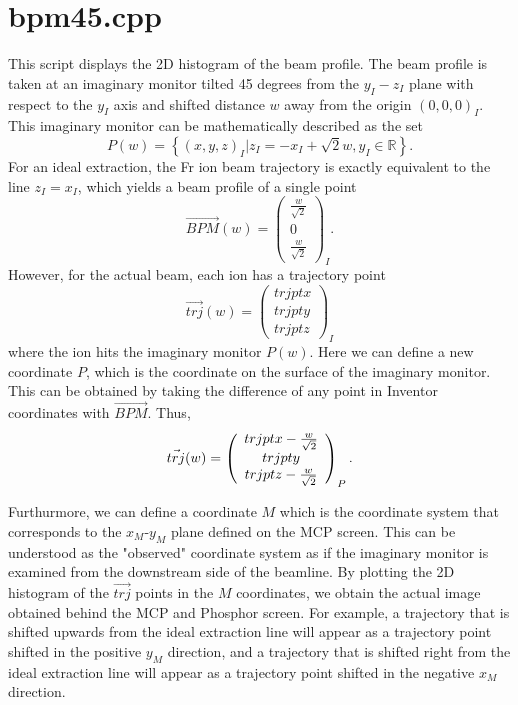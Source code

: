 \documentclass{article}
\begin{document}
\section{bpm45.cpp}
This script displays the 2D histogram of the beam profile. The beam profile is taken at an imaginary monitor tilted 45 degrees from the $y_I-z_I$ plane with respect to the $y_I$ axis and shifted distance $w$ away from the origin $(0,0,0)_I$. This imaginary monitor can be mathematically described as the set 
\begin{equation*}
P(w) = \left\{ (x,y,z)_I | z_I = -x_I + \sqrt{2}w, y_I \in \mathbb{R} \right\}.
\end{equation*}
For an ideal extraction, the Fr ion beam trajectory is exactly equivalent to the line $z_I = x_I$, which yields a beam profile of a single point
\begin{equation*}
\vec{BPM}(w) = \left(
\begin{array}{c}
	\frac{w}{\sqrt{2}}\\
	0 \\
	\frac{w}{\sqrt{2}}
\end{array} \right)_I.
\end{equation*}
However, for the actual beam, each ion has a trajectory point
\begin{equation*}
\vec{trj}(w) = \left(
\begin{array}{c}
	trjptx \\
	trjpty \\
	trjptz
\end{array} \right)_I
\end{equation*}
where the ion hits the imaginary monitor $P(w)$. Here we can define a new coordinate $P$, which is the coordinate on the surface of the imaginary monitor. This can be obtained by taking the difference of any point in Inventor coordinates with $\vec{BPM}$. Thus, 
\begin{equation*}
\vec{trj}(w) = \left(
\begin{array}{c}
	trjptx - \frac{w}{\sqrt{2}} \\
	trjpty \\
	trjptz - \frac{w}{\sqrt{2}}
\end{array} \right)_P . \\
\end{equation*}

Furthurmore, we can define a coordinate $M$ which is the coordinate system that corresponds to the $x_M$-$y_M$ plane defined on the MCP screen. This can be understood as the "observed" coordinate system as if the imaginary monitor is examined from the downstream side of the beamline. By plotting the 2D histogram of the $\vec{trj}$ points in the $M$ coordinates, we obtain the actual image obtained behind the MCP and Phosphor screen. For example, a trajectory that is shifted upwards from the ideal extraction line will appear as a trajectory point shifted in the positive $y_M$ direction, and a trajectory that is shifted right from the ideal extraction line will appear as a trajectory point shifted in the negative $x_M$ direction. \\
\end{document}
